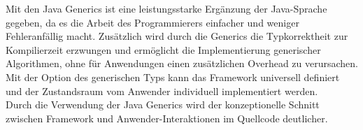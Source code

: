     Mit den Java Generics ist eine leistungsstarke Ergänzung der Java-Sprache gegeben, da es die Arbeit des Programmierers einfacher und 
    weniger Fehleranfällig macht. Zusätzlich wird durch die Generics die Typkorrektheit zur Kompilierzeit erzwungen und ermöglicht 
    die Implementierung generischer Algorithmen, ohne für Anwendungen einen zusätzlichen Overhead zu verursachen. 
    \\
    Mit der Option des generischen Typs kann das Framework universell definiert und der Zustandsraum vom Anwender individuell implementiert werden.
    \\
    \linebreak
    Durch die Verwendung der Java Generics wird der konzeptionelle Schnitt zwischen Framework und Anwender-Interaktionen im Quellcode deutlicher.

